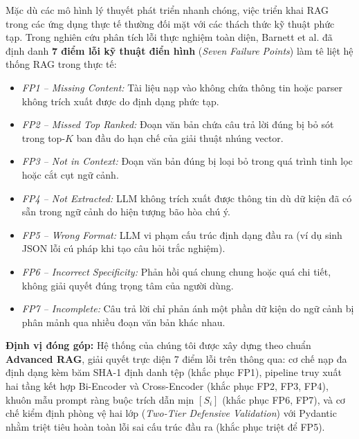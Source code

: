 ﻿\documentclass[12pt]{article}
\begin{document}
Mặc dù các mô hình lý thuyết phát triển nhanh chóng, việc triển khai RAG trong các ứng dụng thực tế thường đối mặt với các thách thức kỹ thuật phức tạp. Trong nghiên cứu phân tích lỗi thực nghiệm toàn diện, Barnett et al. \cite{barnett2024seven_failures} đã định danh \textbf{7 điểm lỗi kỹ thuật điển hình} (\textit{Seven Failure Points}) làm tê liệt hệ thống RAG trong thực tế:
\begin{itemize}
    \item \textit{FP1 -- Missing Content:} Tài liệu nạp vào không chứa thông tin hoặc parser không trích xuất được do định dạng phức tạp.
    \item \textit{FP2 -- Missed Top Ranked:} Đoạn văn bản chứa câu trả lời đúng bị bỏ sót trong top-$K$ ban đầu do hạn chế của giải thuật nhúng vector.
    \item \textit{FP3 -- Not in Context:} Đoạn văn bản đúng bị loại bỏ trong quá trình tinh lọc hoặc cắt cụt ngữ cảnh.
    \item \textit{FP4 -- Not Extracted:} LLM không trích xuất được thông tin dù dữ kiện đã có sẵn trong ngữ cảnh do hiện tượng bão hòa chú ý.
    \item \textit{FP5 -- Wrong Format:} LLM vi phạm cấu trúc định dạng đầu ra (ví dụ sinh JSON lỗi cú pháp khi tạo câu hỏi trắc nghiệm).
    \item \textit{FP6 -- Incorrect Specificity:} Phản hồi quá chung chung hoặc quá chi tiết, không giải quyết đúng trọng tâm của người dùng.
    \item \textit{FP7 -- Incomplete:} Câu trả lời chỉ phản ánh một phần dữ kiện do ngữ cảnh bị phân mảnh qua nhiều đoạn văn bản khác nhau.
\end{itemize}

\noindent \textbf{Định vị đóng góp:} Hệ thống của chúng tôi được xây dựng theo chuẩn \textbf{Advanced RAG}, giải quyết trực diện 7 điểm lỗi trên thông qua: cơ chế nạp đa định dạng kèm băm SHA-1 định danh tệp (khắc phục FP1), pipeline truy xuất hai tầng kết hợp Bi-Encoder và Cross-Encoder (khắc phục FP2, FP3, FP4), khuôn mẫu prompt ràng buộc trích dẫn mịn $[S_i]$ (khắc phục FP6, FP7), và cơ chế kiểm định phòng vệ hai lớp (\textit{Two-Tier Defensive Validation}) với Pydantic nhằm triệt tiêu hoàn toàn lỗi sai cấu trúc đầu ra (khắc phục triệt để FP5).
\end{document}
